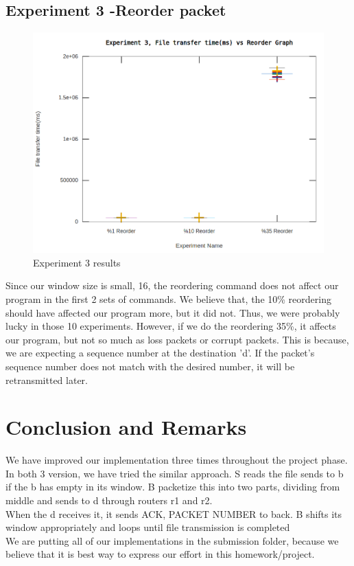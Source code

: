 \documentclass[12pt,journal,compsoc]{IEEEtran}
\begin{document}
\subsection{Experiment 3 -Reorder packet}
\begin{figure}[h!]
\centering
\captionsetup{justification=centering}
\includegraphics[width = \linewidth]{exp3.png}
\caption{Experiment 3 results}
\label{fig:exp2}
\end{figure}
Since our window size is small, 16, the reordering command does not affect our program in the first 2 sets of commands. We believe that, the 10\% reordering should have affected our program more, but it did not. Thus, we were probably lucky in those 10 experiments. However, if we do the reordering 35\%, it affects our program, but not so much as loss packets or corrupt packets. This is because, we are expecting a sequence number at the destination 'd'. If the packet's sequence number does not match with the desired number, it will be retransmitted later.\\
\section{Conclusion and Remarks}
We have improved our implementation three times throughout the project phase.\\
In both 3 version, we have tried the similar approach.
S reads the file sends to b if the b has empty in its window.
B packetize this into two parts, dividing from middle and sends to d through routers r1 and r2.\\
When the d receives it, it sends ACK, PACKET NUMBER to back.
B shifts its window appropriately and loops until file transmission is completed\\
We are putting all of our implementations in the submission folder, because we believe that it is best way to express our effort in this homework/project.\\
\end{document}
